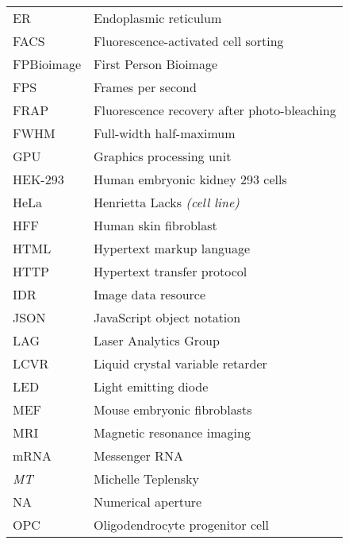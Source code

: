 \begin{flushleft}
\begin{longtable}[l]{|p{5.5em}|p{25em}|}
ER         & Endoplasmic reticulum                                      \\
FACS       & Fluorescence-activated cell sorting                        \\
FPBioimage & First Person Bioimage                                      \\
FPS        & Frames per second                                          \\
FRAP       & Fluorescence recovery after photo-bleaching                \\
FWHM       & Full-width half-maximum                                    \\
GPU        & Graphics processing unit                                   \\
HEK-293    & Human embryonic kidney 293 cells                           \\
HeLa       & Henrietta Lacks \textit{(cell line)}                                \\
HFF        & Human skin fibroblast                                      \\
HTML       & Hypertext markup language                                  \\
HTTP       & Hypertext transfer protocol                                \\
IDR        & Image data resource                                        \\
JSON       & JavaScript object notation                                 \\
LAG        & Laser Analytics Group                                      \\
LCVR       & Liquid crystal variable retarder                           \\
LED        & Light emitting diode                                       \\
MEF        & Mouse embryonic fibroblasts                                \\
MRI        & Magnetic resonance imaging                                \\
mRNA       & Messenger RNA                                              \\
\textit{MT} & Michelle Teplensky                                         \\
NA         & Numerical aperture                                         \\
OPC        & Oligodendrocyte progenitor cell                            \\

\end{longtable}
\end{flushleft}
